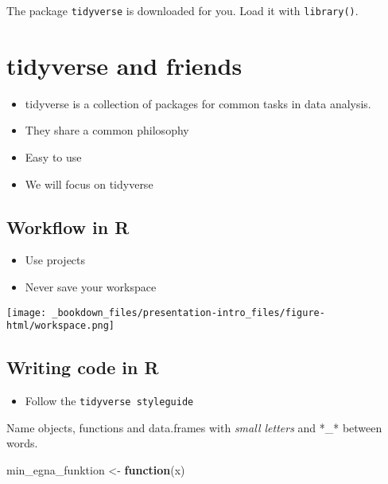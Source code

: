 \documentclass[]{book}
\newenvironment{Shaded}{\begin{snugshade}}{\end{snugshade}}
\newcommand{\ControlFlowTok}[1]{\textcolor[rgb]{0.13,0.29,0.53}{\textbf{#1}}}
\newcommand{\NormalTok}[1]{#1}
\newcommand{\StringTok}[1]{\textcolor[rgb]{0.31,0.60,0.02}{#1}}
\providecommand{\tightlist}{%
  \setlength{\itemsep}{0pt}\setlength{\parskip}{0pt}}
\begin{document}
The package \texttt{tidyverse} is downloaded for you. Load it with \texttt{library()}.

\hypertarget{tidyverse-and-friends}{%
\section{tidyverse and friends}\label{tidyverse-and-friends}}

\begin{itemize}
\item
  tidyverse is a collection of packages for common tasks in data analysis.
\item
  They share a common philosophy
\item
  Easy to use
\item
  We will focus on tidyverse
\end{itemize}

\hypertarget{workflow-in-r}{%
\subsection{Workflow in R}\label{workflow-in-r}}

\begin{itemize}
\tightlist
\item
  Use projects
\item
  Never save your workspace
\end{itemize}

\texttt{[image: \_bookdown\_files/presentation-intro\_files/figure-html/workspace.png]}

\hypertarget{writing-code-in-r}{%
\subsection{Writing code in R}\label{writing-code-in-r}}

\begin{itemize}
\tightlist
\item
  Follow the \texttt{tidyverse\ styleguide}
\end{itemize}

Name objects, functions and data.frames with \emph{small letters} and *\_* between words.

\begin{Shaded}
\begin{Highlighting}[]
\NormalTok{min_egna_funktion <-}\StringTok{ }\ControlFlowTok{function}\NormalTok{(x)}
\end{Highlighting}
\end{Shaded}
\end{document}
